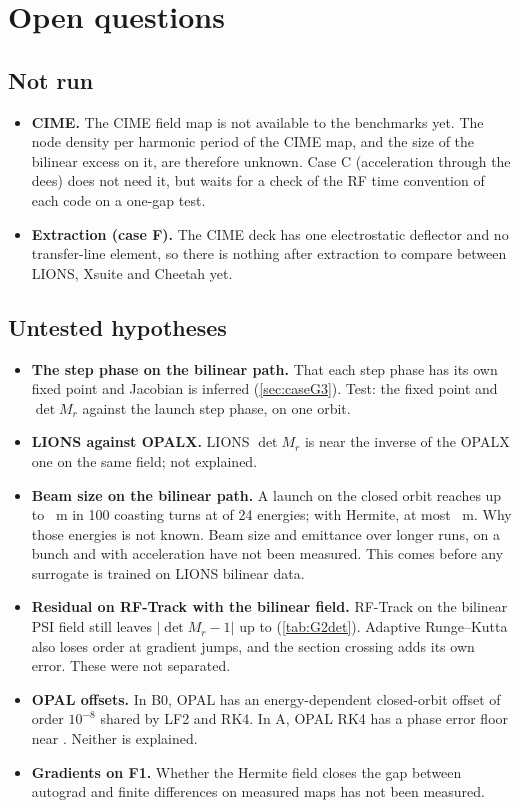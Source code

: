 \chapter{Open questions}\label{ch:open}

\section{Not run}
\begin{itemize}
\item \textbf{CIME.}
The CIME field map is not available to the benchmarks yet.
The node density per harmonic period of the CIME map, and the size of the bilinear excess on it, are therefore unknown.
Case C (acceleration through the dees) does not need it, but waits for a check of the RF time convention of each
code on a one-gap test.
\item \textbf{Extraction (case F).}
The CIME deck has one electrostatic deflector and no transfer-line element, so there is nothing after extraction to
compare between LIONS, Xsuite and Cheetah yet.
\end{itemize}

\section{Untested hypotheses}
\begin{itemize}
\item \textbf{The step phase on the bilinear path.}
That each step phase has its own fixed point and Jacobian is inferred (\cref{sec:caseG3}).
Test: the fixed point and $\det M_r$ against the launch step phase, on one orbit.
\item \textbf{LIONS against OPALX.}
LIONS $\det M_r$ is near the inverse of the OPALX one on the same field; not explained.
\item \textbf{Beam size on the bilinear path.}
A launch on the closed orbit reaches up to \GThreePeakMax{}~m in 100 coasting turns at \GThreePeakN{} of 24 energies; with Hermite, at most \GThreeHermPeakMax{}~m.
Why those energies is not known.
Beam size and emittance over longer runs, on a bunch and with acceleration have not been measured.
This comes before any surrogate is trained on LIONS bilinear data.
\item \textbf{Residual on RF-Track with the bilinear field.}
RF-Track on the bilinear PSI field still leaves $|\det M_r - 1|$ up to \GTwoCRfMax{} (\cref{tab:G2det}).
Adaptive Runge--Kutta also loses order at gradient jumps, and the section crossing adds its own error.
These were not separated.
\item \textbf{OPAL offsets.}
In B0, OPAL has an energy-dependent closed-orbit offset of order $10^{-8}$ shared by LF2 and RK4.
In A, OPAL RK4 has a phase error floor near \ARkFourPhaseFloor.
Neither is explained.
\item \textbf{Gradients on F1.}
Whether the Hermite field closes the gap between autograd and finite differences on measured maps has not been measured.
\end{itemize}

